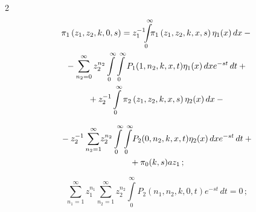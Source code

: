 \begin{multicols}{2}
\begin{multline*}


\pi_1\left(z_1,z_2,k,0,s\right)=


z_1^{-1}\hspace*{-4pt}\int\limits_0^{\infty}


\hspace*{-4pt}\pi_1\left(z_1,z_2,k,x,s\right)\eta_1(x)\,dx-{}\hspace*{-0.78543pt}\\


{}-\sum\limits_{n_2=0}^{\infty}z_2^{n_2}


\int\limits_0^{\infty}\int\limits_0^{\infty}P_1(1,n_2,k,x,t)\eta_1(x)\,dx e^{-st}\,dt+{}\\


{}+


z_2^{-1}\int\limits_0^{\infty}\pi_2\left(z_1,z_2,k,x,s\right)\eta_2(x)\,dx-{}


\end{multline*}





\noindent


\begin{multline}


{}-z_2^{-1}\sum\limits_{n_2=1}^{\infty}\hspace*{-3pt}z_2^{n_2}


\int\limits_0^{\infty}\int\limits_0^{\infty}\!P_2(0,n_2,k,x,t)\eta_2(x)\,dx e^{-st}\,dt+{}\\


{}+


\pi_0(k,s)az_1\,;


\label{third}


\end{multline}





\vspace*{-9pt}





\noindent


\begin{equation}


\sum\limits_{n_1=1}^{\infty}z_1^{n_1}


\sum\limits_{n_2=1}^{\infty}z_2^{n_2}\int\limits_0^{\infty}


P_2\left(n_1,n_2,k,0,t\right)e^{-st}\,dt=0\,;


\label{fourth}



\end{equation}
\end{multicols}
